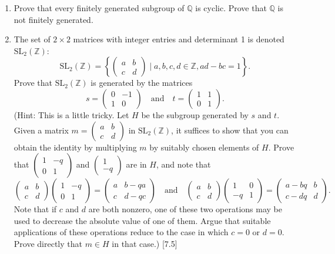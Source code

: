 \begin{enumerate}
    \item Prove that every finitely generated subgroup of $\mathbb{Q}$ is cyclic. Prove that $\mathbb{Q}$ is not finitely generated.

    \item The set of $2 \times 2$ matrices with integer entries and determinant 1 is denoted $\text{SL}_2(\mathbb{Z})$:
          \[ \text{SL}_2(\mathbb{Z}) = \left\{ \begin{pmatrix} a & b \\ c & d \end{pmatrix} \mid a, b, c, d \in \mathbb{Z}, ad-bc=1 \right\}. \]
          Prove that $\text{SL}_2(\mathbb{Z})$ is generated by the matrices
          \[ s = \begin{pmatrix} 0 & -1 \\ 1 & 0 \end{pmatrix} \quad \text{and} \quad t = \begin{pmatrix} 1 & 1 \\ 0 & 1 \end{pmatrix}. \]
          (Hint: This is a little tricky. Let $H$ be the subgroup generated by $s$ and $t$. Given a matrix $m = \begin{pmatrix} a & b \\ c & d \end{pmatrix}$ in $\text{SL}_2(\mathbb{Z})$, it suffices to show that you can obtain the identity by multiplying $m$ by suitably chosen elements of $H$. Prove that $\begin{pmatrix} 1 & -q \\ 0 & 1 \end{pmatrix}$ and $\begin{pmatrix} 1 \\ -q \end{pmatrix}$ are in $H$, and note that
          \[ \begin{pmatrix} a & b \\ c & d \end{pmatrix} \begin{pmatrix} 1 & -q \\ 0 & 1 \end{pmatrix} = \begin{pmatrix} a & b-qa \\ c & d-qc \end{pmatrix} \quad \text{and} \quad \begin{pmatrix} a & b \\ c & d \end{pmatrix} \begin{pmatrix} 1 & 0 \\ -q & 1 \end{pmatrix} = \begin{pmatrix} a-bq & b \\ c-dq & d \end{pmatrix}. \]
          Note that if $c$ and $d$ are both nonzero, one of these two operations may be used to decrease the absolute value of one of them. Argue that suitable applications of these operations reduce to the case in which $c=0$ or $d=0$. Prove directly that $m \in H$ in that case.) [7.5]


\end{enumerate}
